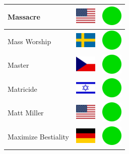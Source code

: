 \documentclass[12pt, a4paper, twoside]{report}
\begin{document}
\begin{center}
\begin{longtable}{|p{5cm}|p{2cm}|p{2cm}|}
 Massacre                                                   & \includegraphics[width=1cm]{../img/flags/us} &   \includegraphics[width=1cm]{../likes/y} \\ \hline
 Mass Worship                                               & \includegraphics[width=1cm]{../img/flags/se} &   \includegraphics[width=1cm]{../likes/y} \\ \hline
 Master                                                     & \includegraphics[width=1cm]{../img/flags/cz} &   \includegraphics[width=1cm]{../likes/y} \\ \hline
 Matricide                                                  & \includegraphics[width=1cm]{../img/flags/il} &   \includegraphics[width=1cm]{../likes/y} \\ \hline
 Matt Miller                                                & \includegraphics[width=1cm]{../img/flags/us} &   \includegraphics[width=1cm]{../likes/y} \\ \hline
 Maximize Bestiality                                        & \includegraphics[width=1cm]{../img/flags/de} &   \includegraphics[width=1cm]{../likes/y} \\ \hline

\end{longtable}
\end{center}
\end{document}

